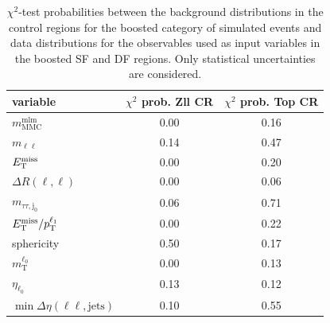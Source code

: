\begin{table}
	\centering
    \caption{$\chi^2$-test probabilities between the background distributions in the control regions for the boosted category of simulated events and data distributions for the observables
    used as input variables in the boosted SF and DF regions.
    Only statistical uncertainties are considered.}\label{tab:mva:modeling:cr:boost}
	\begin{tabular}{lcc}
		\toprule
		variable & $\chi^2$ prob. Zll CR & $\chi^2$ prob. Top CR \\ \midrule
		$m_\text{MMC}^\text{mlm}$                   & 0.00 & 0.16 \\
		$m_{\ell\ell}$                              & 0.14 & 0.47 \\
		$E_\text{T}^\text{miss}$                                   & 0.00 & 0.20 \\
		$\Delta R (\ell, \ell)$                     & 0.00 & 0.06 \\
		$m_{\tau\tau,\text{j}_0} $                  & 0.06 & 0.71 \\
		$E_\text{T}^\text{miss} / p_\text{T}^{\ell_1}$                    & 0.00 & 0.22 \\
		sphericity                                  & 0.50 & 0.17 \\
		$m_\text{T}^{\ell_0}$                       & 0.00 & 0.13 \\
		$\eta_{\ell_0}$                             & 0.13 & 0.12 \\
		$\min \Delta \eta (\ell\ell, \text{jets})$  & 0.10 & 0.55 \\
		\bottomrule
	\end{tabular}
\end{table}


